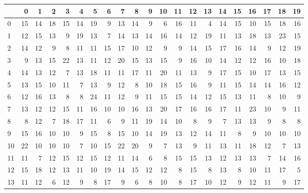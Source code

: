 \documentclass[12pt]{article}
\begin{document}
\begin{table}[H]
    \begin{center}
        \begin{tabular}{|l|r|r|r|r|r|r|r|r|r|r|r|r|r|r|r|r|r|r|r|r|}
            \hline
               & 0  & 1  & 2  & 3  & 4  & 5  & 6  & 7  & 8  & 9  & 10 & 11 & 12 & 13 & 14 & 15 & 16 & 17 & 18 & 19 \\
            \hline
            0  & 15 & 14 & 18 & 15 & 14 & 19 & 9  & 13 & 14 & 9  & 6  & 16 & 11 & 4  & 14 & 15 & 10 & 15 & 18 & 16 \\
            1  & 12 & 15 & 13 & 9  & 19 & 13 & 7  & 14 & 13 & 14 & 16 & 14 & 12 & 19 & 11 & 13 & 18 & 13 & 23 & 15 \\
            2  & 14 & 12 & 9  & 8  & 11 & 11 & 15 & 17 & 10 & 12 & 9  & 9  & 14 & 15 & 17 & 16 & 14 & 9  & 12 & 19 \\
            3  & 9  & 13 & 15 & 22 & 13 & 11 & 12 & 20 & 15 & 13 & 15 & 9  & 16 & 10 & 14 & 12 & 12 & 16 & 10 & 18 \\
            4  & 14 & 13 & 12 & 7  & 13 & 18 & 11 & 11 & 17 & 11 & 20 & 11 & 13 & 9  & 17 & 15 & 10 & 17 & 13 & 15 \\
            5  & 13 & 15 & 10 & 11 & 7  & 13 & 9  & 12 & 8  & 10 & 18 & 15 & 16 & 9  & 11 & 15 & 14 & 14 & 16 & 12 \\
            6  & 12 & 16 & 13 & 8  & 8  & 24 & 11 & 12 & 9  & 11 & 15 & 15 & 14 & 12 & 15 & 13 & 11 & 8  & 10 & 9  \\
            7  & 13 & 12 & 12 & 15 & 11 & 16 & 10 & 10 & 16 & 13 & 20 & 17 & 16 & 16 & 17 & 11 & 23 & 10 & 9  & 11 \\
            8  & 8  & 12 & 7  & 18 & 17 & 11 & 6  & 9  & 11 & 19 & 14 & 10 & 8  & 9  & 7  & 13 & 13 & 9  & 8  & 8  \\
            9  & 15 & 16 & 10 & 10 & 9  & 15 & 8  & 15 & 10 & 14 & 19 & 13 & 12 & 14 & 11 & 8  & 9  & 10 & 10 & 10 \\
            10 & 22 & 10 & 10 & 10 & 7  & 10 & 15 & 22 & 20 & 9  & 7  & 13 & 9  & 11 & 13 & 11 & 18 & 12 & 7  & 13 \\
            11 & 11 & 7  & 12 & 15 & 12 & 15 & 12 & 11 & 14 & 6  & 8  & 15 & 15 & 13 & 12 & 13 & 13 & 7  & 14 & 16 \\
            12 & 15 & 18 & 12 & 13 & 11 & 10 & 19 & 14 & 15 & 12 & 12 & 8  & 15 & 8  & 13 & 8  & 10 & 11 & 17 & 5  \\
            13 & 11 & 12 & 6  & 12 & 9  & 8  & 17 & 9  & 6  & 8  & 10 & 8  & 17 & 10 & 12 & 9  & 12 & 11 & 9  & 17 \\

\end{tabular}
\end{center}
\end{table}
\end{document}
